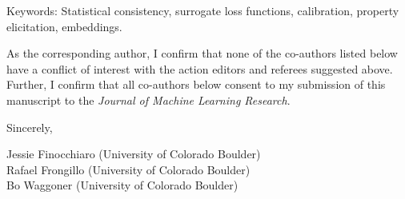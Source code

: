 Keywords: Statistical consistency, surrogate loss functions, calibration, property elicitation, embeddings.

As the corresponding author, I confirm that none of the co-authors listed below have a conflict of interest with the action editors and referees suggested above. Further, I confirm that all co-authors below consent to my submission of this manuscript to the \emph{Journal of Machine Learning Research}.

\bigskip

Sincerely,

\medskip

Jessie Finocchiaro (University of Colorado Boulder)\\
Rafael Frongillo (University of Colorado Boulder)\\
Bo Waggoner (University of Colorado Boulder)








































